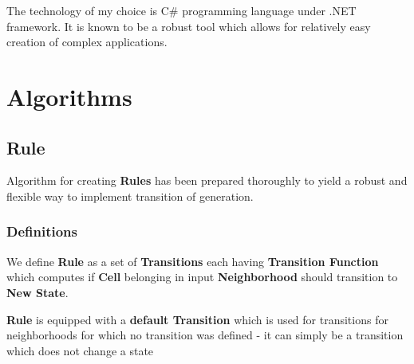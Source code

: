 \documentclass{article}
\begin{document}
The technology of my choice is C\# programming language under .NET framework.
It is known to be a robust tool which allows for relatively easy creation
of complex applications.


\newpage


\section{Algorithms}

\subsection{Rule}

Algorithm for creating {\bf Rules} has been prepared thoroughly to yield a robust and flexible
way to implement transition of generation.

\subsubsection{Definitions}

We define {\bf Rule} as a set of {\bf Transitions} each having {\bf Transition Function} 
which computes if {\bf Cell} 
belonging in input {\bf Neighborhood} should transition to {\bf New State}.

{\bf Rule} is equipped with a {\bf default Transition} which is used for transitions
for neighborhoods for which no transition was defined - it can simply be a transition which
does not change a state
\end{document}
